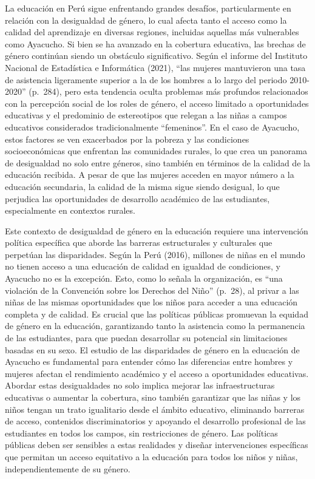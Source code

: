\documentclass[
]{article}
\begin{document}
La educación en Perú sigue enfrentando grandes desafíos, particularmente
en relación con la desigualdad de género, lo cual afecta tanto el acceso
como la calidad del aprendizaje en diversas regiones, incluidas aquellas
más vulnerables como Ayacucho. Si bien se ha avanzado en la cobertura
educativa, las brechas de género continúan siendo un obstáculo
significativo. Según el informe del Instituto Nacional de Estadística e
Informática (2021), ``las mujeres mantuvieron una tasa de asistencia
ligeramente superior a la de los hombres a lo largo del periodo
2010-2020'' (p.~284), pero esta tendencia oculta problemas más profundos
relacionados con la percepción social de los roles de género, el acceso
limitado a oportunidades educativas y el predominio de estereotipos que
relegan a las niñas a campos educativos considerados tradicionalmente
``femeninos''. En el caso de Ayacucho, estos factores se ven exacerbados
por la pobreza y las condiciones socioeconómicas que enfrentan las
comunidades rurales, lo que crea un panorama de desigualdad no solo
entre géneros, sino también en términos de la calidad de la educación
recibida. A pesar de que las mujeres acceden en mayor número a la
educación secundaria, la calidad de la misma sigue siendo desigual, lo
que perjudica las oportunidades de desarrollo académico de las
estudiantes, especialmente en contextos rurales.

Este contexto de desigualdad de género en la educación requiere una
intervención política específica que aborde las barreras estructurales y
culturales que perpetúan las disparidades. Según la Perú (2016),
millones de niñas en el mundo no tienen acceso a una educación de
calidad en igualdad de condiciones, y Ayacucho no es la excepción. Esto,
como lo señala la organización, es ``una violación de la Convención
sobre los Derechos del Niño'' (p.~28), al privar a las niñas de las
mismas oportunidades que los niños para acceder a una educación completa
y de calidad. Es crucial que las políticas públicas promuevan la equidad
de género en la educación, garantizando tanto la asistencia como la
permanencia de las estudiantes, para que puedan desarrollar su potencial
sin limitaciones basadas en su sexo. El estudio de las disparidades de
género en la educación de Ayacucho es fundamental para entender cómo las
diferencias entre hombres y mujeres afectan el rendimiento académico y
el acceso a oportunidades educativas. Abordar estas desigualdades no
solo implica mejorar las infraestructuras educativas o aumentar la
cobertura, sino también garantizar que las niñas y los niños tengan un
trato igualitario desde el ámbito educativo, eliminando barreras de
acceso, contenidos discriminatorios y apoyando el desarrollo profesional
de las estudiantes en todos los campos, sin restricciones de género. Las
políticas públicas deben ser sensibles a estas realidades y diseñar
intervenciones específicas que permitan un acceso equitativo a la
educación para todos los niños y niñas, independientemente de su género.
\end{document}
